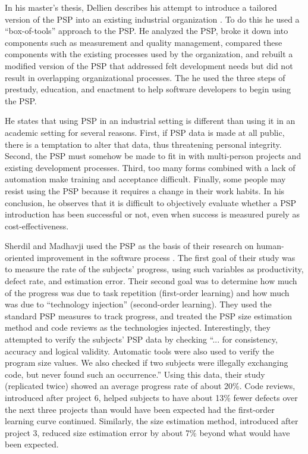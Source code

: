 In his master's thesis, Dellien describes his attempt to introduce a
tailored version of the PSP into an existing industrial organization
\cite{Dellien97}. To do this he used a ``box-of-tools'' approach to the
PSP.  He analyzed the PSP, broke it down into components such as
measurement and quality management, compared these components with the
existing processes used by the organization, and rebuilt a modified version
of the PSP that addressed felt development needs but did not result in
overlapping organizational processes.  The he used the three steps of
prestudy, education, and enactment to help software developers to begin
using the PSP.

He states that using PSP in an industrial setting is different than using
it in an academic setting for several reasons.  First, if PSP data is made
at all public, there is a temptation to alter that data, thus threatening
personal integrity. Second, the PSP must somehow be made to fit in with
multi-person projects and existing development processes.  Third, too many
forms combined with a lack of automation make training and acceptance
difficult.  Finally, some people may resist using the PSP because it
requires a change in their work habits.  In his conclusion, he observes
that it is difficult to objectively evaluate whether a PSP introduction has
been successful or not, even when success is measured purely as
cost-effectiveness.

Sherdil and Madhavji used the PSP as the basis of their research on
human-oriented improvement in the software process \cite{sherdil96}.  The
first goal of their study was to measure the rate of the subjects'
progress, using such variables as productivity, defect rate, and estimation
error.  Their second goal was to determine how much of the progress was due
to task repetition (first-order learning) and how much was due to
``technology injection'' (second-order learning).  They used the standard
PSP measures to track progress, and treated the PSP size estimation method
and code reviews as the technologies injected.  Interestingly, they
attempted to verify the subjects' PSP data by checking ``... for
consistency, accuracy and logical validity.  Automatic tools were also used
to verify the program size values.  We also checked if two subjects were
illegally exchanging code, but never found such an occurrence.'' Using this
data, their study (replicated twice) showed an average progress rate of
about 20\%.  Code reviews, introduced after project 6, helped subjects to
have about 13\% fewer defects over the next three projects than would have
been expected had the first-order learning curve continued.  Similarly, the
size estimation method, introduced after project 3, reduced size estimation
error by about 7\% beyond what would have been expected.

